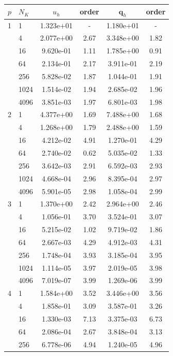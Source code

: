 \begin{table}[H]
\begin{center}
\begin{tabular}{llcccc} \hline
$p$ & $N_K$ & $u_h$ & order & $\bm{q}_h$ & order \\
\hline
1 & 1 & 1.323e+01 & - & 1.180e+01 & -\\ 
  & 4 & 2.077e+00 & 2.67 & 3.348e+00 & 1.82\\
  & 16 & 9.620e-01 & 1.11 & 1.785e+00 & 0.91\\
  & 64 & 2.134e-01 & 2.17 & 3.911e-01 & 2.19\\
  & 256 & 5.828e-02 & 1.87 & 1.044e-01 & 1.91\\
  & 1024 & 1.514e-02 & 1.94 & 2.685e-02 & 1.96\\
  & 4096 & 3.851e-03 & 1.97 & 6.801e-03 & 1.98\\
\hline
2 & 1 & 4.377e+00 & 1.69 & 7.488e+00 & 1.68\\
  & 4 & 1.268e+00 & 1.79 & 2.488e+00 & 1.59\\
  & 16 & 4.212e-02 & 4.91 & 1.270e-01 & 4.29\\
  & 64 & 2.740e-02 & 0.62 & 5.035e-02 & 1.33\\
  & 256 & 3.642e-03 & 2.91 & 6.592e-03 & 2.93\\
  & 1024 & 4.668e-04 & 2.96 & 8.395e-04 & 2.97\\
  & 4096 & 5.901e-05 & 2.98 & 1.058e-04 & 2.99\\
\hline
3 & 1 & 1.370e+00 & 2.42 & 2.964e+00 & 2.46\\
  & 4 & 1.056e-01 & 3.70 & 3.524e-01 & 3.07\\
  & 16 & 5.215e-02 & 1.02 & 9.719e-02 & 1.86\\
  & 64 & 2.667e-03 & 4.29 & 4.912e-03 & 4.31\\
  & 256 & 1.748e-04 & 3.93 & 3.185e-04 & 3.95\\
  & 1024 & 1.114e-05 & 3.97 & 2.019e-05 & 3.98\\
  & 4096 & 7.019e-07 & 3.99 & 1.269e-06 & 3.99\\
\hline
4 & 1 & 1.584e+00 & 3.52 & 3.446e+00 & 3.56\\
  & 4 & 1.858e-01 & 3.09 & 3.587e-01 & 3.26\\
  & 16 & 1.330e-03 & 7.13 & 3.375e-03 & 6.73\\
  & 64 & 2.086e-04 & 2.67 & 3.848e-04 & 3.13\\
  & 256 & 6.778e-06 & 4.94 & 1.240e-05 & 4.96\\

\end{tabular}
\end{center}
\end{table}
